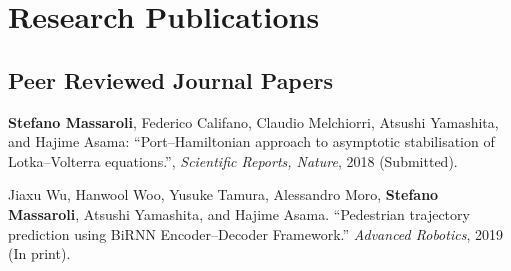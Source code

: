 \chapter*{Research Publications}

\thispagestyle{empty}

\newpage
\section*{Peer Reviewed Journal Papers}
\begin{enumerate}[{[}j1{]}]
	\item \textbf{Stefano Massaroli}, Federico Califano, Claudio Melchiorri, Atsushi Yamashita, and Hajime Asama: ``Port--Hamiltonian approach to asymptotic stabilisation of Lotka--Volterra equations.'', \textit{Scientific Reports, Nature}, 2018 (Submitted).
	\item Jiaxu Wu, Hanwool Woo, Yusuke Tamura, Alessandro Moro, \textbf{Stefano Massaroli},
	Atsushi Yamashita, and Hajime Asama. ``Pedestrian trajectory prediction using BiRNN
	Encoder--Decoder Framework.'' \textit{Advanced Robotics}, 2019 (In print).
\end{enumerate}

